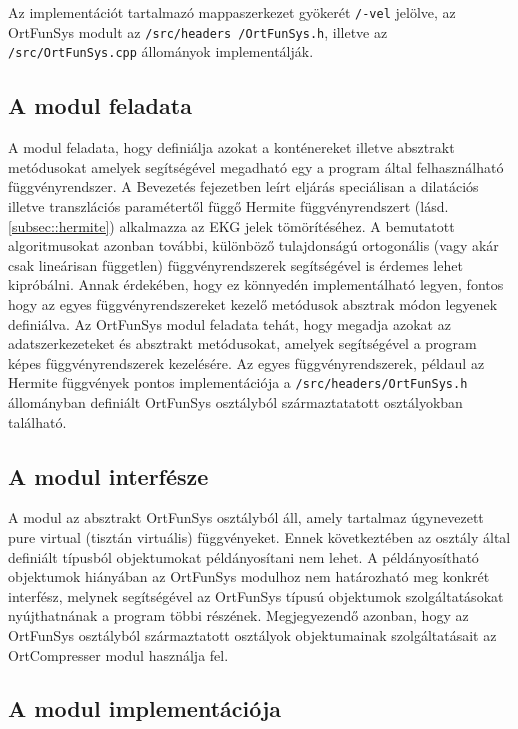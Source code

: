 \documentclass[oneside,titlepage,12pt,a4paper]{report}
\begin{document}
Az implementációt tartalmazó mappaszerkezet gyökerét \texttt{/-vel} jelölve, az OrtFunSys modult  az \texttt{/src/headers
/OrtFunSys.h}, illetve az \texttt{/src/OrtFunSys.cpp} állományok implementálják.

\subsection*{A modul feladata}

\par A modul feladata, hogy definiálja azokat a konténereket illetve absztrakt metódusokat amelyek segítségével 
megadható egy a program által felhasználható függvényrendszer. A Bevezetés fejezetben leírt eljárás speciálisan a dilatációs illetve transzlációs paramétertől függő Hermite függvényrendszert (lásd. \ref{subsec::hermite}) alkalmazza az EKG jelek tömörítéséhez. A bemutatott algoritmusokat azonban további, különböző tulajdonságú ortogonális (vagy akár csak lineárisan független) 
függvényrendszerek segítségével is érdemes lehet kipróbálni. Annak érdekében, hogy ez könnyedén implementálható legyen, fontos hogy az egyes függvényrendszereket kezelő metódusok absztrak módon legyenek definiálva.
Az OrtFunSys modul feladata tehát, hogy megadja azokat az adatszerkezeteket és absztrakt metódusokat, amelyek segítségével a program képes függvényrendszerek kezelésére. Az egyes függvényrendszerek, példaul az Hermite függvények pontos implementációja
a \texttt{/src/headers/OrtFunSys.h} állományban definiált OrtFunSys osztályból származtatatott osztályokban található. 


\subsection*{A modul interfésze}

\par A modul az absztrakt OrtFunSys osztályból áll, amely tartalmaz úgynevezett pure virtual (tisztán virtuális) függvényeket. Ennek következtében az osztály által definiált típusból objektumokat példányosítani nem lehet. A példányosítható objektumok hiányában
az OrtFunSys modulhoz nem határozható meg konkrét interfész, melynek segítségével az OrtFunSys típusú objektumok szolgáltatásokat nyújthatnának a program többi részének. Megjegyezendő azonban, hogy az OrtFunSys osztályból származtatott osztályok objektumainak szolgáltatásait az OrtCompresser
modul használja fel. 

\subsection*{A modul implementációja}
\end{document}

